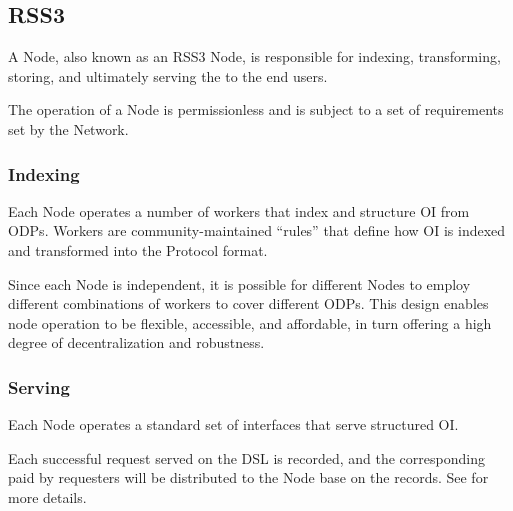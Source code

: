 \subsection{RSS3 }
\label{subsec:Node}

A \gls{Node}, also known as an RSS3 Node, is responsible for indexing, transforming, storing, and ultimately serving the  to the end users.

The operation of a \gls{Node} is permissionless and is subject to a set of requirements set by the Network.

\subsubsection{Indexing}
Each \gls{Node} operates a number of workers that index and structure \gls{OI} from \glspl{ODP}.
Workers are community-maintained ``rules'' that define how \gls{OI} is indexed and transformed into the \gls{Protocol} format.

Since each \gls{Node} is independent, it is possible for different \glspl{Node} to employ different combinations of workers to cover different \glspl{ODP}.
This design enables node operation to be flexible, accessible, and affordable, in turn offering a high degree of decentralization and robustness.

\subsubsection{Serving}
Each \gls{Node} operates a standard set of interfaces that serve structured \gls{OI}.

Each successful request served on the \gls{DSL} is recorded, and the corresponding  paid by requesters will be distributed to the \gls{Node} base on the records.
See  for more details.